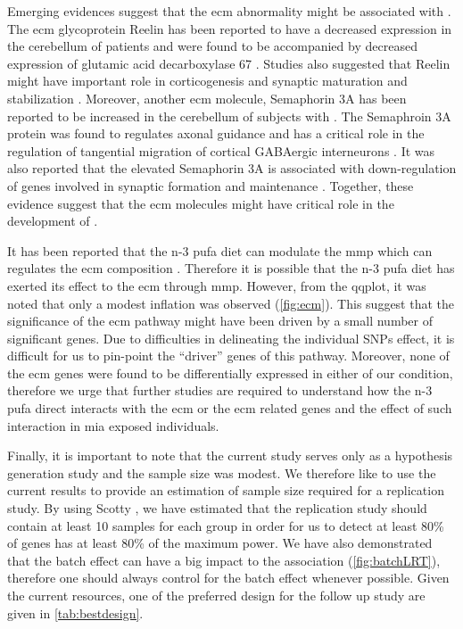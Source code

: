 Emerging evidences suggest that the \gls{ecm} abnormality might be associated with  \citep{Berretta2012}.
The \gls{ecm} glycoprotein Reelin has been reported to have a decreased expression in the cerebellum of  patients \citep{Maloku2010} and were found to be accompanied by decreased expression of glutamic acid decarboxylase 67 \citep{Costa2001}.
Studies also suggested that Reelin might have important role in corticogenesis and synaptic maturation and stabilization \citep{Berretta2012}.
Moreover, another \gls{ecm} molecule, Semaphorin 3A has been reported to be increased in the cerebellum of subjects with  \citep{Eastwood2003}.
The Semaphroin 3A protein was found to regulates axonal guidance and has a critical role in the  regulation of tangential migration of cortical GABAergic interneurons \citep{Zimmer2010}.
It was also reported that the elevated Semaphorin 3A is associated with down-regulation of genes involved in synaptic formation and maintenance \citep{Eastwood2003}.
Together, these evidence suggest that the \gls{ecm} molecules might have critical role in the development of .

It has been reported that the n-3 \gls{pufa} diet can modulate the \gls{mmp} \citep{Derosa2009,Kavazos2015} which can regulates the \gls{ecm} composition \citep{Stamenkovic2003}.
Therefore it is possible that the n-3 \gls{pufa} diet has exerted its effect to the \gls{ecm} through \gls{mmp}.
However, from the \gls{qqplot}, it was noted that only a modest inflation was observed (\cref{fig:ecm}).
This suggest that the significance of the \gls{ecm} pathway might have been driven by a small number of significant genes.
Due to difficulties in delineating the individual \glspl{SNP} effect, it is difficult for us to pin-point the ``driver'' genes of this pathway.
Moreover, none of the \gls{ecm} genes were found to be differentially expressed in either of our condition, therefore we urge that further studies are required to understand how the n-3 \gls{pufa} direct interacts with the \gls{ecm} or the \gls{ecm} related genes and the effect of such interaction in \gls{mia} exposed individuals.

Finally, it is important to note that the current study serves only as a hypothesis generation study and the sample size was modest. 
We therefore like to use the current results to provide an estimation of sample size required for a replication study.
By using Scotty \citep{Busby2013}, we have estimated that the replication study should contain at least 10 samples for each group in order for us to detect at least 80\% of genes has at least 80\% of the maximum power. 
We have also demonstrated that the batch effect can have a big impact to the association (\cref{fig:batchLRT}), therefore one should always control for the batch effect whenever possible.
Given the current resources, one of the preferred design for the follow up study are given in \cref{tab:bestdesign}.

